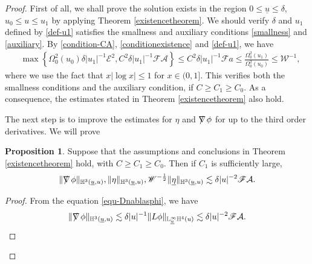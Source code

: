 \documentclass[11pt,reqno]{amsart}
\theoremstyle{definition}
\newtheorem{proposition}{Proposition}[section]
\numberwithin{equation}{section}
\renewcommand{\L}{\mathbb{L}}
\renewcommand{\H}{\mathbb{H}}
\def\etab{\underline{\eta}}
\def\ub{\underline{u}}
\def\nablas{\mbox{$\nabla \mkern -13mu /$ }}
\begin{document}
\begin{proof}
First of all, we shall prove the solution exists in the region $0\le\ub\le\delta$, $u_0\le u\le u_1$ by applying Theorem \ref{existencetheorem}. We should verify $\delta$ and $u_1$ defined by \eqref{def-u1} satisfies the smallness and auxiliary conditions \eqref{smallness} and \eqref{auxiliary}. By \eqref{condition-CA}, \eqref{conditionexistence} and \eqref{def-u1}, we have
\begin{align*}
&\max\left\{\Omega_0^2(u_0)\delta|u_1|^{-1}\mathscr{E}^2, C^2\delta|u_1|^{-1}\mathscr{F}\mathcal{A}\right\}\le C^2\delta|u_1|^{-1}\mathscr{F}a\le\frac{\Omega_0^2(u_1)}{\Omega_0^2(u_0)}\le\mathscr{W}^{-1},
\end{align*}
where we use the fact that $x|\log x|\le 1$ for $x\in(0,1]$. This verifies both the smallness conditions and the auxiliary condition, if $C\ge C_1\ge C_0$. As a consequence, the estimates stated in Theorem \ref{existencetheorem} also hold.

The next step is to improve the estimates for $\eta$ and $\nablas\phi$ for up to the third order derivatives. We will prove
\begin{proposition}
Suppose that the assumptions and conclusions in Theorem \ref{existencetheorem} hold, with $C\ge C_1\ge C_0$. Then if $C_1$ is sufficiently large, 
\begin{align*}
\|\nablas\phi\|_{\H^3(\ub,u)},\|\eta\|_{\H^3(\ub,u)},\mathscr{W}^{-\frac{1}{2}}\|\etab\|_{\H^3(\ub,u)}\lesssim \delta|u|^{-2}\mathscr{F}\mathcal{A}.
\end{align*}
\end{proposition}
\begin{proof}
From the equation \eqref{equ-Dnablasphi}, we have
\begin{align}\label{estimate-nablasphi-improve}
\|\nablas\phi\|_{\H^3(\ub,u)}\lesssim\delta|u|^{-1}\|L\phi\|_{\L^\infty_{\ub}\H^4(u)}\lesssim\delta|u|^{-2}\mathscr{F}\mathcal{A}.
\end{align}


\end{proof}
\end{proof}
\end{document}
